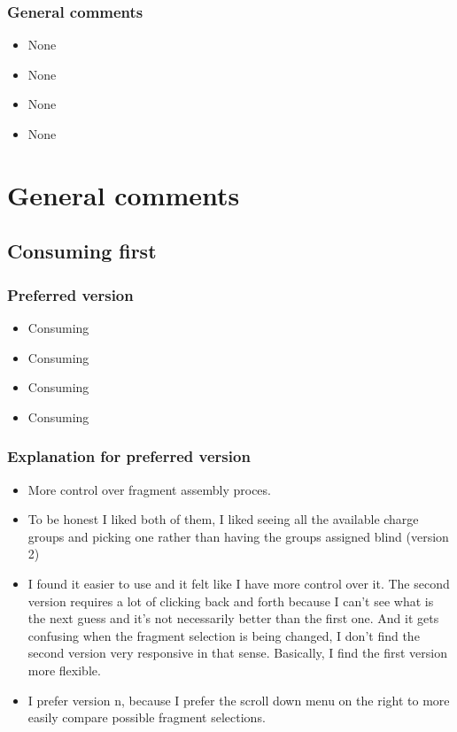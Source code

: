 \subsubsection{General comments}
\begin{itemize}
\item None

\item None

\item None

\item None

\end{itemize}


\section{General comments}
\subsection{Consuming first}
\subsubsection{Preferred version}
\begin{itemize}
\item Consuming

\item Consuming

\item Consuming

\item Consuming

\end{itemize}


\subsubsection{Explanation for preferred version}
\begin{itemize}
\item More control over fragment assembly proces. 

\item To be honest I liked both of them, I liked seeing all the available charge groups and picking one rather than having the groups assigned blind (version 2)

\item I found it easier to use and it felt like I have more control over it. The second version requires a lot of clicking back and forth because I can't see what is the next guess and it's not necessarily better than the first one. And it gets confusing when the fragment selection is being changed, I don't find the second version very responsive in that sense. Basically, I find the first version more flexible.

\item I prefer version n, because I prefer the scroll down menu on the right to more easily compare possible fragment selections.

\end{itemize}



